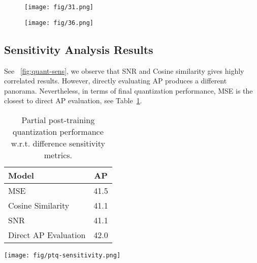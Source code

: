 \documentclass[10pt,twocolumn,letterpaper]{article}
\begin{document}
\begin{figure*}[ht]
    \centering
   \begin{subfigure}{0.45\textwidth}
   	 \texttt{[image: fig/31.png]}
	 \caption{}
    \end{subfigure}
     \begin{subfigure}{0.45\textwidth}
         \texttt{[image: fig/36.png]}
         \caption{}
     \end{subfigure}
\caption{More examples of better optimized layers in YOLOv6s that are otherwise hard to quantize.}
    \label{fig:more_repopt_act_map}
  \end{figure*}
  
\subsection{Sensitivity Analysis Results}\label{app:quant-sens}

See ~\cref{fig:quant-sens}, we observe that SNR and Cosine similarity gives highly correlated results. However, directly evaluating AP produces a different panorama. Nevertheless, in terms of final quantization performance, MSE is the closest to direct AP evaluation, see Table~\ref{tab:quant-sens-map}.

\begin{table}[ht]
\centering
  \begin{tabular}{@{}l|c@{}}
    \toprule
    Model & AP \\
    \midrule
    \midrule
    MSE & 41.5\\
    Cosine Similarity & 41.1 \\
    SNR & 41.1 \\
    Direct AP Evaluation & 42.0 \\
    \bottomrule
  \end{tabular}
\caption{Partial post-training quantization performance w.r.t. difference sensitivity metrics.}
\label{tab:quant-sens-map}
\end{table}

\begin{figure*}[ht]
    \centering
    \texttt{[image: fig/ptq-sensitivity.png]}
    \caption{Quantization sensitivity analysis of all layers in YOLOv6s trained with RepOptimizer.}
    \label{fig:quant-sens}
  \end{figure*}
\end{document}
